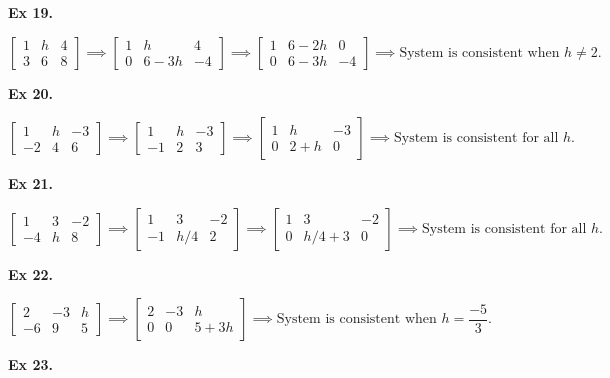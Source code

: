 \documentclass{article}
\begin{document}
\textbf{Ex 19.}

$
\begin{bmatrix}
1 &h &4\\
3 &6 &8
\end{bmatrix}
\implies
\begin{bmatrix}
1 &h &4\\
0 &6-3h &-4
\end{bmatrix}
\implies
\begin{bmatrix}
1 &6-2h &0\\
0 &6-3h &-4
\end{bmatrix}
\implies \text{System is consistent when $h \neq 2$.}
$

\textbf{Ex 20.}

$
\begin{bmatrix}
1 &h &-3\\
-2 &4 &6
\end{bmatrix}
\implies
\begin{bmatrix}
1 &h &-3\\
-1 &2 &3
\end{bmatrix}
\implies
\begin{bmatrix}
1 &h &-3\\
0 &2+h &0
\end{bmatrix}
\implies \text{System is consistent for all $h$.}
$

\textbf{Ex 21.}

$
\begin{bmatrix}
1 &3 &-2\\
-4 &h &8
\end{bmatrix}
\implies
\begin{bmatrix}
1 &3 &-2\\
-1 &h/4 &2
\end{bmatrix}
\implies
\begin{bmatrix}
1 &3 &-2\\
0 &h/4+3 &0
\end{bmatrix}
\implies \text{System is consistent for all $h$.}
$

\textbf{Ex 22.}

$
\begin{bmatrix}
2 &-3 &h\\
-6 &9 &5
\end{bmatrix}
\implies
\begin{bmatrix}
2 &-3 &h\\
0 &0 &5+3h
\end{bmatrix}
\implies \text{System is consistent when $h=\dfrac{-5}{3}$.}
$

\textbf{Ex 23.}
\end{document}
